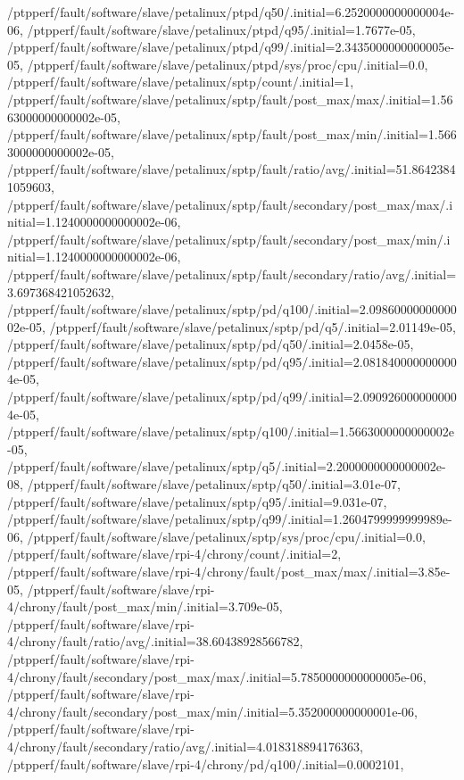 {    /ptpperf/fault/software/slave/petalinux/ptpd/q50/.initial=6.2520000000000004e-06,
    /ptpperf/fault/software/slave/petalinux/ptpd/q95/.initial=1.7677e-05,
    /ptpperf/fault/software/slave/petalinux/ptpd/q99/.initial=2.3435000000000005e-05,
    /ptpperf/fault/software/slave/petalinux/ptpd/sys/proc/cpu/.initial=0.0,
    /ptpperf/fault/software/slave/petalinux/sptp/count/.initial=1,
    /ptpperf/fault/software/slave/petalinux/sptp/fault/post_max/max/.initial=1.5663000000000002e-05,
    /ptpperf/fault/software/slave/petalinux/sptp/fault/post_max/min/.initial=1.5663000000000002e-05,
    /ptpperf/fault/software/slave/petalinux/sptp/fault/ratio/avg/.initial=51.86423841059603,
    /ptpperf/fault/software/slave/petalinux/sptp/fault/secondary/post_max/max/.initial=1.1240000000000002e-06,
    /ptpperf/fault/software/slave/petalinux/sptp/fault/secondary/post_max/min/.initial=1.1240000000000002e-06,
    /ptpperf/fault/software/slave/petalinux/sptp/fault/secondary/ratio/avg/.initial=3.697368421052632,
    /ptpperf/fault/software/slave/petalinux/sptp/pd/q100/.initial=2.0986000000000002e-05,
    /ptpperf/fault/software/slave/petalinux/sptp/pd/q5/.initial=2.01149e-05,
    /ptpperf/fault/software/slave/petalinux/sptp/pd/q50/.initial=2.0458e-05,
    /ptpperf/fault/software/slave/petalinux/sptp/pd/q95/.initial=2.0818400000000004e-05,
    /ptpperf/fault/software/slave/petalinux/sptp/pd/q99/.initial=2.0909260000000004e-05,
    /ptpperf/fault/software/slave/petalinux/sptp/q100/.initial=1.5663000000000002e-05,
    /ptpperf/fault/software/slave/petalinux/sptp/q5/.initial=2.2000000000000002e-08,
    /ptpperf/fault/software/slave/petalinux/sptp/q50/.initial=3.01e-07,
    /ptpperf/fault/software/slave/petalinux/sptp/q95/.initial=9.031e-07,
    /ptpperf/fault/software/slave/petalinux/sptp/q99/.initial=1.2604799999999989e-06,
    /ptpperf/fault/software/slave/petalinux/sptp/sys/proc/cpu/.initial=0.0,
    /ptpperf/fault/software/slave/rpi-4/chrony/count/.initial=2,
    /ptpperf/fault/software/slave/rpi-4/chrony/fault/post_max/max/.initial=3.85e-05,
    /ptpperf/fault/software/slave/rpi-4/chrony/fault/post_max/min/.initial=3.709e-05,
    /ptpperf/fault/software/slave/rpi-4/chrony/fault/ratio/avg/.initial=38.60438928566782,
    /ptpperf/fault/software/slave/rpi-4/chrony/fault/secondary/post_max/max/.initial=5.7850000000000005e-06,
    /ptpperf/fault/software/slave/rpi-4/chrony/fault/secondary/post_max/min/.initial=5.352000000000001e-06,
    /ptpperf/fault/software/slave/rpi-4/chrony/fault/secondary/ratio/avg/.initial=4.018318894176363,
    /ptpperf/fault/software/slave/rpi-4/chrony/pd/q100/.initial=0.0002101,
}
